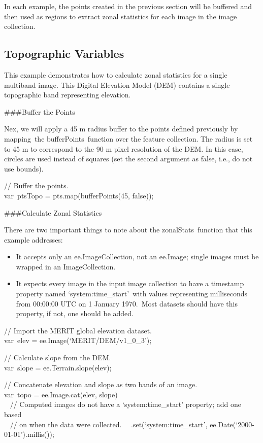 \documentclass[
  letterpaper,
  DIV=11,
  numbers=noendperiod]{scrreprt}
\providecommand{\tightlist}{%
  \setlength{\itemsep}{0pt}\setlength{\parskip}{0pt}}\usepackage{longtable,booktabs,array}
\begin{document}
In each example, the points created in the previous section will be
buffered and then used as regions to extract zonal statistics for each
image in the image collection.

\hypertarget{topographic-variables}{%
\subsection{Topographic Variables}\label{topographic-variables}}

This example demonstrates how to calculate zonal statistics for a single
multiband image. This Digital Elevation Model (DEM) contains a single
topographic band representing elevation.

\#\#\#Buffer the Points

Nex, we will apply a 45 m radius buffer to the points defined previously
by mapping~the bufferPoints~function over the feature collection. The
radius is set to 45 m to correspond to the 90 m pixel resolution of the
DEM. In this case, circles are used instead of squares (set the second
argument as false, i.e., do not use bounds).

// Buffer the points.\\
var~ptsTopo = pts.map(bufferPoints(45, false));

\#\#\#Calculate Zonal Statistics

There are two important things to note about the zonalStats~function
that this example addresses:

\begin{itemize}
\tightlist
\item
  It accepts only an ee.ImageCollection, not an ee.Image; single images
  must be wrapped in an ImageCollection.
\item
  It expects every image in the input image collection to have a
  timestamp property named `system:time\_start'~with values representing
  milliseconds from 00:00:00 UTC on 1 January 1970.~Most datasets should
  have this property, if not, one should be added.
\end{itemize}

// Import the MERIT global elevation dataset.\\
var~elev = ee.Image(`MERIT/DEM/v1\_0\_3');

// Calculate slope from the DEM.\\
var~slope = ee.Terrain.slope(elev);

// Concatenate elevation and slope as two bands of an image.\\
var~topo = ee.Image.cat(elev, slope)\\
\hspace*{0.333em} ~ // Computed images do not have a
`system:time\_start' property; add one based\\
\hspace*{0.333em} ~ // on when the data were collected.~
~.set(`system:time\_start', ee.Date(`2000-01-01').millis());
\end{document}
